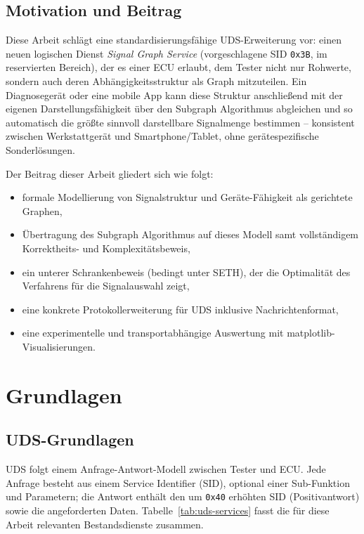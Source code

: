﻿\documentclass[a4paper,12pt]{article}
\theoremstyle{definition}
\begin{document}
\subsection{Motivation und Beitrag}

Diese Arbeit schlägt eine standardisierungsfähige UDS-Erweiterung vor: einen neuen logischen Dienst \emph{Signal Graph Service} (vorgeschlagene SID \texttt{0x3B}, im reservierten Bereich), der es einer ECU erlaubt, dem Tester nicht nur Rohwerte, sondern auch deren Abhängigkeitsstruktur als Graph mitzuteilen. Ein Diagnosegerät oder eine mobile App kann diese Struktur anschließend mit der eigenen Darstellungsfähigkeit über den Subgraph Algorithmus abgleichen und so automatisch die größte sinnvoll darstellbare Signalmenge bestimmen -- konsistent zwischen Werkstattgerät und Smartphone/Tablet, ohne gerätespezifische Sonderlösungen.

Der Beitrag dieser Arbeit gliedert sich wie folgt:
\begin{itemize}
	\item formale Modellierung von Signalstruktur und Geräte-Fähigkeit als gerichtete Graphen,
	\item Übertragung des Subgraph Algorithmus auf dieses Modell samt vollständigem Korrektheits- und Komplexitätsbeweis,
	\item ein unterer Schrankenbeweis (bedingt unter SETH), der die Optimalität des Verfahrens für die Signalauswahl zeigt,
	\item eine konkrete Protokollerweiterung für UDS inklusive Nachrichtenformat,
	\item eine experimentelle und transportabhängige Auswertung mit matplotlib-Visualisierungen.
\end{itemize}

\section{Grundlagen}

\subsection{UDS-Grundlagen}

UDS folgt einem Anfrage-Antwort-Modell zwischen Tester und ECU. Jede Anfrage besteht aus einem Service Identifier (SID), optional einer Sub-Funktion und Parametern; die Antwort enthält den um \texttt{0x40} erhöhten SID (Positivantwort) sowie die angeforderten Daten. Tabelle~\ref{tab:uds-services} fasst die für diese Arbeit relevanten Bestandsdienste zusammen.
\end{document}
